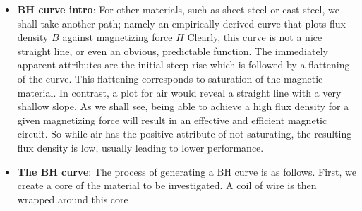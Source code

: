 \documentclass{report}
\begin{document}
\begin{itemize}
            \bigbreak \noindent 
            \bigbreak \noindent 
            As a result, it is impractical to find reluctance in same manner that we find resistance. All is not lost, though.
            \bigbreak \noindent 
            The flux density and corresponding magnetizing force for any given material are related by the following equation
            \begin{align*}
                B = \mu H
            .\end{align*}
            \begin{itemize}
                \item $B$ is the flux density in teslas,
                \item $\mu$ is the permeability of the material in henries/meter,
                \item $H$ is the magnetizing force in amp-turns/meter.
            \end{itemize}
            Once again, the tricky bit here is the permeability of the core material. For air, we can use the permeability of free space, $\mu_{0}$
            \begin{align*}
                \mu_{0} = 4\pi \times 10^{-7} \frac{H}{m} \approx 1.257 \times 10^{-6} \frac{H}{m}
            .\end{align*}
        \item \textbf{BH curve intro}: For other materials, such as sheet steel or cast steel, we shall take another path; namely an empirically derived curve that plots flux density $B$ against magnetizing force $H$
            \bigbreak \noindent 
            \bigbreak \noindent 
            Clearly, this curve is not a nice straight line, or even an obvious, predictable function. The immediately apparent attributes are the initial steep rise which is followed by a flattening of the curve. This flattening corresponds to saturation of the magnetic material. In contrast, a plot for air would reveal a straight line with a very shallow slope. As we shall see, being able to achieve a high flux density for a given magnetizing force will result in an effective and efficient magnetic circuit. So while air has the positive attribute of not saturating, the resulting flux density is low, usually leading to lower performance.
        \item \textbf{The BH curve}:  The process of generating a BH curve is as follows. First, we create a core of the material to be investigated. A coil of wire is then wrapped around this core

\end{itemize}
\end{document}
